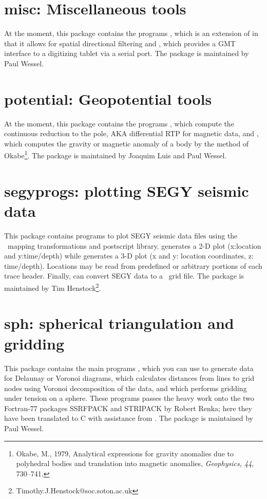 \section{misc: Miscellaneous tools}

At the moment, this package contains the programs , which
is an extension of  in that it allows for spatial directional
filtering and , which provides a GMT interface
to a digitizing tablet via a serial port.
The package is maintained by Paul Wessel.

\section{potential: Geopotential tools}

At the moment, this package contains the programs , which
compute the continuous reduction to the pole, AKA differential RTP for magnetic data,
and , which computes the gravity or magnetic anomaly of a body by
the method of Okabe\footnote{Okabe, M., 1979, Analytical expressions for gravity anomalies due to polyhedral bodies and translation into 
magnetic anomalies, \emph{Geophysics, 44}, 730--741.}.
The package is maintained by Joaquim Luis and Paul Wessel.

\section{segyprogs: plotting SEGY seismic data}

This package contains programs to plot SEGY seismic data files using
the \GMT\ mapping transformations and postscript library.  generates
a 2-D plot (x:location and y:time/depth) while  generates a
3-D plot (x and y: location coordinates, z: time/depth). Locations may be
read from predefined or arbitrary portions of each trace header.  Finally,
 can convert SEGY data to a \GMT\ grid file.
The package is maintained by Tim Henstock\footnote{Timothy.J.Henstock@soc.soton.ac.uk}.

\section{sph: spherical triangulation and gridding}

This package contains the main programs ,
which you can use to generate data for Delaunay or Voronoi diagrams, 
 which calculates distances from lines to grid
nodes using Voronoi decomposition of the data, and
 which performs gridding under tension on
a sphere.  These programs passes the heavy work onto the two Fortran-77
packages SSRFPACK and STRIPACK by Robert Renka; here they have been
translated to C with assistance from .
The package is maintained by Paul Wessel.

